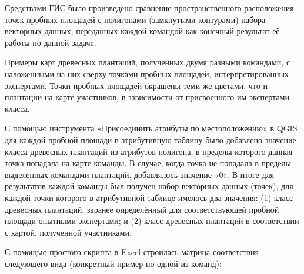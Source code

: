 Средствами ГИС было произведено сравнение пространственного расположения точек пробных площадей с полигонами (замкнутыми контурами) набора векторных данных, переданных каждой командой как конечный результат её работы по данной задаче.


\begin{center}
    Примеры карт древесных плантаций, полученных двумя разными командами, с наложенными на них сверху точками пробных площадей, интерпретированных экспертами. Точки пробных площадей окрашены теми же цветами, что и плантации на карте участников, в зависимости от присвоенного им экспертами класса.
\end{center}

С помощью инструмента «Присоединить атрибуты по местоположению» в QGIS для каждой пробной площади в атрибутивную таблицу было добавлено значение класса древесных плантаций из атрибутов полигона, в пределы которого данная точка попадала на карте команды. В случае, когда точка не попадала в пределы выделенных командами плантаций, добавлялось значение «0». В итоге для результатов каждой команды был получен набор векторных данных (точек), для каждой точки которого в атрибутивной таблице имелось два значения: (1) класс древесных плантаций, заранее определённый для соответствующей пробной площади опытными экспертами; и (2) класс древесных плантаций в соответствии с картой, полученной участниками.

С помощью простого скрипта в Excel строилась матрица соответствия следующего вида (конкретный пример по одной из команд):

